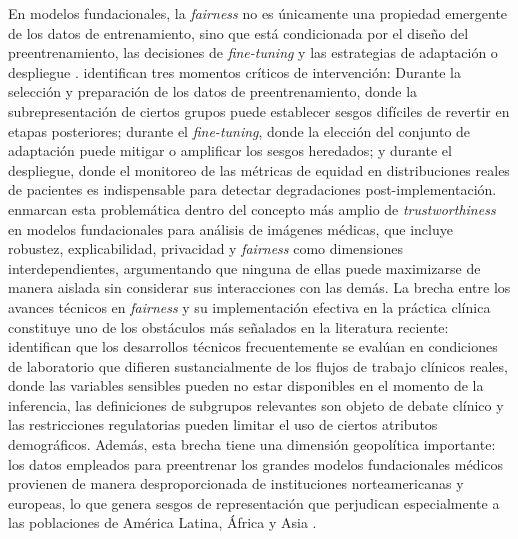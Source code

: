 En modelos fundacionales, la \textit{fairness} no es únicamente una propiedad emergente de los datos de entrenamiento, sino que está condicionada por el diseño del preentrenamiento, las decisiones de \textit{fine-tuning} y las estrategias de adaptación o despliegue \citep{queiroz2026}. \textcite{queiroz2026} identifican tres momentos críticos de intervención: Durante la selección y preparación de los datos de preentrenamiento, donde la subrepresentación de ciertos grupos puede establecer sesgos difíciles de revertir en etapas posteriores; durante el \textit{fine-tuning}, donde la elección del conjunto de adaptación puede mitigar o amplificar los sesgos heredados; y durante el despliegue, donde el monitoreo de las métricas de equidad en distribuciones reales de pacientes es indispensable para detectar degradaciones post-implementación. \textcite{shi2024} enmarcan esta problemática dentro del concepto más amplio de \textit{trustworthiness} en modelos fundacionales para análisis de imágenes médicas, que incluye robustez, explicabilidad, privacidad y \textit{fairness} como dimensiones interdependientes, argumentando que ninguna de ellas puede maximizarse de manera aislada sin considerar sus interacciones con las demás. La brecha entre los avances técnicos en \textit{fairness} y su implementación efectiva en la práctica clínica constituye uno de los obstáculos más señalados en la literatura reciente: \textcite{liu2024gaps} identifican que los desarrollos técnicos frecuentemente se evalúan en condiciones de laboratorio que difieren sustancialmente de los flujos de trabajo clínicos reales, donde las variables sensibles pueden no estar disponibles en el momento de la inferencia, las definiciones de subgrupos relevantes son objeto de debate clínico y las restricciones regulatorias pueden limitar el uso de ciertos atributos demográficos. Además, esta brecha tiene una dimensión geopolítica importante: los datos empleados para preentrenar los grandes modelos fundacionales médicos provienen de manera desproporcionada de instituciones norteamericanas y europeas, lo que genera sesgos de representación que perjudican especialmente a las poblaciones de América Latina, África y Asia \citep{queiroz2026}.


